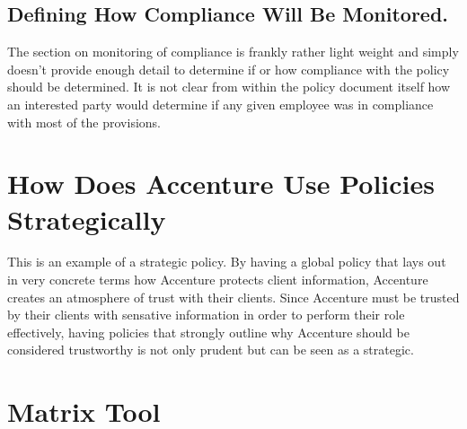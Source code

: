 \documentclass[stu]{apa7}
\begin{document}
\subsection{Defining How Compliance Will Be Monitored.}
\label{sec:org85a9316}

The section on monitoring of compliance is frankly rather light weight and simply doesn't provide enough detail to determine if or how compliance with the policy should be determined. It is not clear from within the policy document itself how an interested party would determine if any given employee was in compliance with most of the provisions.

\section{How Does Accenture Use Policies Strategically}
\label{sec:org3e5c2f1}

This is an example of a strategic policy. By having a global policy that lays out in very concrete terms how Accenture protects client information, Accenture creates an atmosphere of trust with their clients. Since Accenture must be trusted by their clients with sensative information in order to perform their role effectively, having policies that strongly outline why Accenture should be considered trustworthy is not only prudent but can be seen as a strategic.


\appendix

\section{Matrix Tool}
\label{sec:org17f9b6f}
\end{document}
